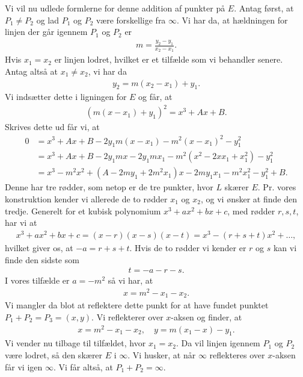 Vi vil nu udlede formlerne for denne addition af punkter på $E$. Antag først, at $P_1 \neq P_2$ og lad $P_1$ og $P_2$ være forskellige fra $\infty$. Vi har da, at hældningen for linjen der går igennem $P_1$ og $P_2$ er
\begin{align*}
	m = \frac{y_2 - y_1}{x_2 - x_1}.
\end{align*}
Hvis $x_1 = x_2$ er linjen lodret, hvilket er et tilfælde som vi behandler senere. Antag altså at $x_1 \neq x_2$, vi har da
\begin{align*}
	y_2 = m(x_2 - x_1) + y_1.
\end{align*}
Vi indsætter dette i ligningen for $E$ og får, at 
\begin{align*}
	(m(x-x_1) + y_1)^2 = x^3 + Ax + B.
\end{align*}
Skrives dette ud får vi, at
\begin{align*}
	0 &= x^3 + Ax + B - 2y_1 m(x-x_1) - m^2 (x - x_1)^2 - y_{1}^{2} \\
	&= x^3 + Ax + B - 2y_1 m x - 2y_1 m x_1 - m^2 (x^2 -2x x_1 + x_{1}^{2}) - y_{1}^{2} \\
	&= x^3 - m^2 x^2 + (A-2my_1 +2m^2x_1)x -2m y_1 x_1 -m^2 x_{1}^{2} - y_{1}^{2} + B. 
\end{align*}
Denne har tre rødder, som netop er de tre punkter, hvor $L$ skærer $E$.
Pr. vores konstruktion kender vi allerede de to rødder $x_1$ og $x_2$,
og vi ønsker at finde den tredje. Generelt for et kubisk polynomium 
$x^3 + ax^2 + bx + c$, med rødder $r, s, t$, har vi at 
\begin{align*}
	x^3 + ax^2 + bx + c = (x - r)(x - s)(x - t) = x^3 - (r + s + t)x^2 + \ldots,
\end{align*}
hvilket giver os, at $-a = r + s + t$. Hvis de to rødder vi kender er $r$ og $s$
kan vi finde den sidste som
\begin{align*}
	t = -a - r - s.
\end{align*}
I vores tilfælde er $a=-m^2$ så vi har, at 
\begin{align*}
	x = m^2 - x_1 - x_2.
\end{align*}
Vi mangler da blot at reflektere dette punkt for at have fundet 
punktet $P_1 + P_2 = P_3 = (x, y)$. Vi reflekterer over $x$-aksen og finder, at 
\begin{align*}
	x = m^2 - x_1 - x_2, \quad y = m(x_1 - x) - y_1.
\end{align*}
Vi vender nu tilbage til tilfældet, hvor $x_1 = x_2$. Da vil linjen igennem 
$P_1$ og $P_2$ være lodret, så den skærer $E$ i $\infty$. Vi husker, at når $\infty$ 
reflekteres over $x$-aksen får vi igen $\infty$. Vi får altså, at $P_1 + P_2=\infty$.

